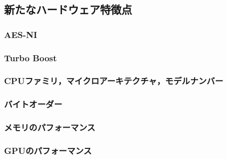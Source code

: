 \subsection{新たなハードウェア特徴点}
\subsubsection{AES-NI}
\subsubsection{Turbo Boost}
\subsubsection{CPUファミリ，マイクロアーキテクチャ，モデルナンバー}
\subsubsection{バイトオーダー}
\subsubsection{メモリのパフォーマンス}
\subsubsection{GPUのパフォーマンス}
